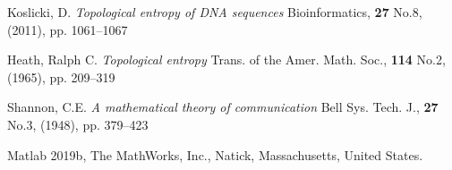 \documentclass{article}
\begin{document}
\pagebreak


\begin{thebibliography}{99}


Koslicki, D.
\textit{Topological entropy of DNA sequences}
Bioinformatics, \textbf{27} No.8, (2011), pp. 1061–1067

Heath, Ralph C. 
\textit{Topological entropy}
Trans. of the Amer. Math. Soc., \textbf{114} No.2, (1965), pp. 209–319

Shannon, C.E.
\textit{A mathematical theory of communication}
Bell Sys. Tech. J., \textbf{27} No.3, (1948), pp. 379–423

Matlab 2019b, The MathWorks, Inc., Natick, Massachusetts, United States.

\end{thebibliography}
\end{document}
